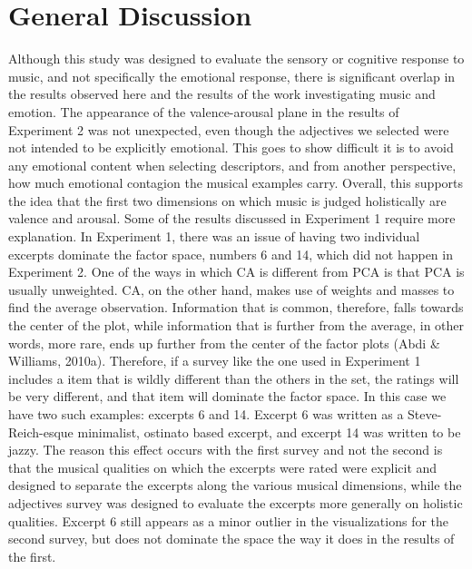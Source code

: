 \documentclass[
  english,
  man,floatsintext]{apa6}
\begin{document}
\hypertarget{general-discussion}{%
\section{General Discussion}\label{general-discussion}}

Although this study was designed to evaluate the sensory or cognitive response to music, and not specifically the emotional response, there is significant overlap in the results observed here and the results of the work investigating music and emotion. The appearance of the valence-arousal plane in the results of Experiment 2 was not unexpected, even though the adjectives we selected were not intended to be explicitly emotional. This goes to show difficult it is to avoid any emotional content when selecting descriptors, and from another perspective, how much emotional contagion the musical examples carry. Overall, this supports the idea that the first two dimensions on which music is judged holistically are valence and arousal.
Some of the results discussed in Experiment 1 require more explanation. In Experiment 1, there was an issue of having two individual excerpts dominate the factor space, numbers 6 and 14, which did not happen in Experiment 2. One of the ways in which CA is different from PCA is that PCA is usually unweighted. CA, on the other hand, makes use of weights and masses to find the average observation. Information that is common, therefore, falls towards the center of the plot, while information that is further from the average, in other words, more rare, ends up further from the center of the factor plots (Abdi \& Williams, 2010a). Therefore, if a survey like the one used in Experiment 1 includes a item that is wildly different than the others in the set, the ratings will be very different, and that item will dominate the factor space. In this case we have two such examples: excerpts 6 and 14. Excerpt 6 was written as a Steve-Reich-esque minimalist, ostinato based excerpt, and excerpt 14 was written to be jazzy. The reason this effect occurs with the first survey and not the second is that the musical qualities on which the excerpts were rated were explicit and designed to separate the excerpts along the various musical dimensions, while the adjectives survey was designed to evaluate the excerpts more generally on holistic qualities. Excerpt 6 still appears as a minor outlier in the visualizations for the second survey, but does not dominate the space the way it does in the results of the first.
\end{document}
